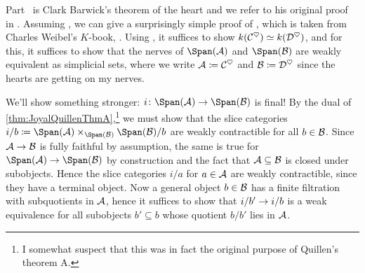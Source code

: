 \documentclass[a4paper, 10pt, oneside, DIV=9, chapterprefix=true, numbers=enddot,bibliography=totoc]{scrbook}
\begin{document}
\begin{proof*}
	Part~ is Clark Barwick's theorem of the heart and we refer to his original proof in \cite{BarwickHeart}. Assuming , we can give a surprisingly simple proof of , which is taken from Charles Weibel's $K$-book, \cite[Chapter~\href{https://sites.math.rutgers.edu/~weibel/Kbook/Kbook.V.pdf}{V} \S4]{WeibelKBook}. Using , it suffices to show $k(\mathcal{C}^\heartsuit)\simeq k(\mathcal{D}^\heartsuit)$, and for this, it suffices to show that the nerves of $\Span(\Aa)$ and $\Span(\Bb)$ are weakly equivalent as simplicial sets, where we write $\mathcal{A}\coloneqq\mathcal{C}^\heartsuit$ and $\mathcal{B}\coloneqq\mathcal{D}^\heartsuit$ since the hearts are getting on my nerves.
	
	We'll show something stronger: $i\colon \Span(\Aa)\morphism \Span(\Bb)$ is final! By the dual of \cref{thm:JoyalQuillenThmA},\footnote{I somewhat suspect that this was in fact the original purpose of Quillen's theorem A.} we must show that the slice categories $i/b\coloneqq \Span(\Aa)\times_{\Span(\Bb)}\Span(\Bb)/b$ are weakly contractible for all $b\in \mathcal{B}$. Since $\Aa\morphism \Bb$ is fully faithful by assumption, the same is true for $\Span(\Aa)\morphism \Span(\Bb)$ by construction and the fact that $\mathcal{A}\subseteq \mathcal{B}$ is closed under subobjects. Hence the slice categories $i/a$ for $a\in \mathcal{A}$ are weakly contractible, since they have a terminal object. Now a general object $b\in \mathcal{B}$ has a finite filtration with subquotients in $\mathcal{A}$, hence it suffices to show that $i/b'\morphism i/b$ is a weak equivalence for all subobjects $b'\subseteq b$ whose quotient $b/b'$ lies in $\mathcal{A}$.
	

\end{proof*}
\end{document}
